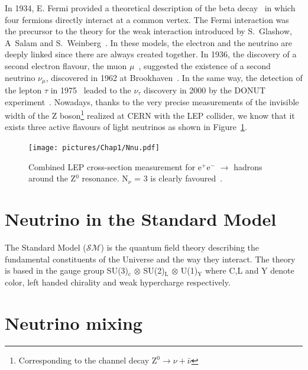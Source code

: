 \documentclass[main.tex]{subfiles}
\begin{document}
\bigskip


\NI In 1934, E. Fermi provided a theoretical description of the beta decay~\cite{FermiTheory} in which four fermions directly interact at a common vertex. The Fermi interaction was the precursor to the theory for the weak interaction introduced by S.~Glashow, A~Salam and S.~Weinberg~\cite{Glashow,Salam,Weinberg}. In these models, the electron and the neutrino are deeply linked since there are always created together. In 1936, the discovery of a second electron flavour, the muon $\mu$~\cite{MuonDiscovery}, suggested the existence of a second neutrino $\nu_\mu$, discovered in 1962 at Brookhaven~\cite{MuonNeutrino}. In the same way, the detection of the lepton $\tau$ in 1975~\cite{TauDiscovery} leaded to the $\nu_\tau$ discovery in 2000 by the DONUT experiment~\cite{TauNeutrino}. Nowadays, thanks to the very precise measurements of the invisible width of the Z boson\footnote{Corresponding to the channel decay Z$^\text{0} \rightarrow \nu + \bar{\nu}$} realized at CERN with the LEP collider, we know that it exists three active flavours of light neutrinos as shown in Figure~\ref{LEP-Z0-width}.



\begin{figure}
\begin{center}
\texttt{[image: pictures/Chap1/Nnu.pdf]}
\caption{Combined LEP cross-section measurement for e$^+$e$^-$ $\rightarrow$ hadrons around the Z$^\text{0}$ resonance. N$_{\nu}$ = 3 is clearly favoured~\cite{ALEPH3neutrino}.}
\label{LEP-Z0-width}
\end{center}
\end{figure}


\FloatBarrier


\section{Neutrino in the Standard Model}\label{sec:NeutrinoInSM}


\NI The Standard Model ($\mathcal{SM}$) is the quantum field theory describing the fundamental constituents of the Universe and the way they interact. The theory is based in the gauge group SU(3)$_\text{c}$ $\otimes$ SU(2)$_\text{L}$ $\otimes$ U(1)$_\text{Y}$ where C,L and Y denote color, left handed chirality and weak hypercharge respectively. 


\section{Neutrino mixing}\label{sec:NeutrinoMixing}
\end{document}
